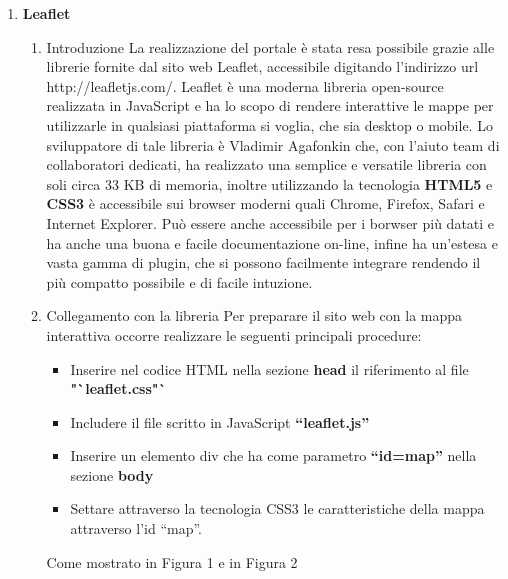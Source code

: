 \documentclass[a4paper,11pt]{article}
\newcommand{\tab}[1]{\hspace{.3\textwidth}\rlap{#1}}
\begin{document}
\begin{enumerate}
	\item \LARGE{\textbf{Leaflet}}
		\begin{enumerate}
			\Large
			\item {Introduzione}\newline
La realizzazione del portale è stata resa possibile grazie alle librerie fornite dal sito web Leaflet, accessibile digitando l'indirizzo url http://leafletjs.com/.
			Leaflet è una moderna libreria open-source realizzata in JavaScript e ha lo scopo di rendere interattive le mappe per utilizzarle in qualsiasi piattaforma si voglia, che sia desktop o mobile. Lo sviluppatore di tale libreria è Vladimir Agafonkin che, con l'aiuto team di collaboratori dedicati, ha realizzato una semplice e versatile libreria con soli circa 33 KB di memoria, inoltre utilizzando la tecnologia \textbf{HTML5} e \textbf{CSS3} è accessibile sui browser moderni quali Chrome, Firefox, Safari e Internet Explorer. Può essere anche accessibile per i borwser più datati e ha anche una buona e facile documentazione on-line, infine ha un'estesa e vasta gamma di plugin, che si possono facilmente integrare rendendo il più compatto possibile e di facile intuzione.	
			\medskip
			\item Collegamento con la libreria\newline
Per preparare il sito web con la mappa interattiva occorre realizzare le seguenti principali procedure:
			\begin{itemize}
				\item Inserire nel codice HTML nella sezione \textbf{head} il riferimento al file \textbf{"`leaflet.css"`}
				\item Includere il file scritto in JavaScript \textbf{"`leaflet.js"'}
				\item Inserire un elemento div che ha come parametro \textbf{"`id=map"'} nella sezione \textbf{body}
				\item Settare attraverso la tecnologia CSS3 le caratteristiche della mappa attraverso l'id "`map"'.				
			\end{itemize}
Come mostrato in Figura 1 e in Figura 2

			\begin{figure}[!ht]
				
			\end{figure}
			\tab {\textbf{Figura 1}}
			\newpage
			\begin{figure}[!ht]
				
			\end{figure}
			\tab{\textbf{Figura 2}}
				\newline				
			\medskip
			

\end{enumerate}
\end{enumerate}
\end{document}
